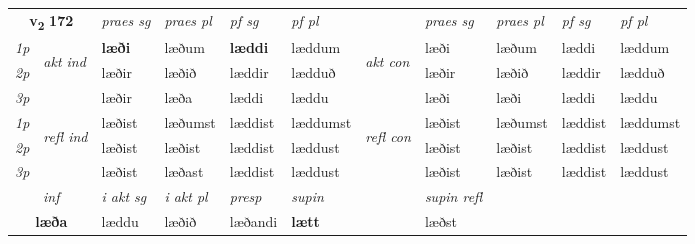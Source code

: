 \noindent
\begin{tabular}{lllllllllll} \toprule
\multicolumn{2}{c}{\textbf{v{\textsubscript{2}}} \Large{\textbf{172}}}  &  \textit{praes sg}  & \textit{praes pl}  &\textit{ pf sg} & \textit{pf pl} &  &  \textit{praes sg}  & \textit{praes pl}  & \textit{pf sg} & \textit{pf pl } \\*
	\cmidrule{3-6} \cmidrule{8-11}
 {\textit{1p}} & \multirow{3}{*}{\begin{turn}{90}\textit{akt ind}\end{turn}} & \textbf{læði} & læðum & \textbf{læddi} & læddum & \multirow{3}{*}{\begin{turn}{90}\textit{akt con}\end{turn}} &læði & læðum & læddi & læddum\\*
 {\textit{2p}} &  &  læðir  & læðið & læddir & lædduð & & læðir & læðið & læddir & lædduð \\*
{\textit{3p}} &  & læðir & læða & læddi & læddu & & læði & læði& læddi & læddu \\*
\cmidrule{3-6} \cmidrule{8-11}
 {\textit{1p}} & \multirow{3}{*}{\begin{turn}{90}\textit{refl ind}\end{turn}}  & læðist & læðumst & læddist & læddumst & \multirow{3}{*}{\begin{turn}{90}\textit{refl con}\end{turn}}  &læðist & læðumst & læddist & læddumst \\*
 {\textit{2p}} &  & læðist & læðist & læddist & læddust & &læðist & læðist & læddist & læddust \\*
 {\textit{3p}}  & & læðist & læðast & læddist & læddust & & læðist & læðist& læddist & læddust \\*
\cmidrule{3-6} \cmidrule{8-11}

   \multicolumn{2}{c}{\textit{inf}}  & \textit{i akt sg} & \textit{i akt pl}   & \textit{presp} & \textit{supin} && \textit{supin refl}  \\*
  \multicolumn{2}{c}{\textbf{læða}} & læddu  & læðið   & læðandi &  \textbf{lætt} && læðst  \\*
\end{tabular}

